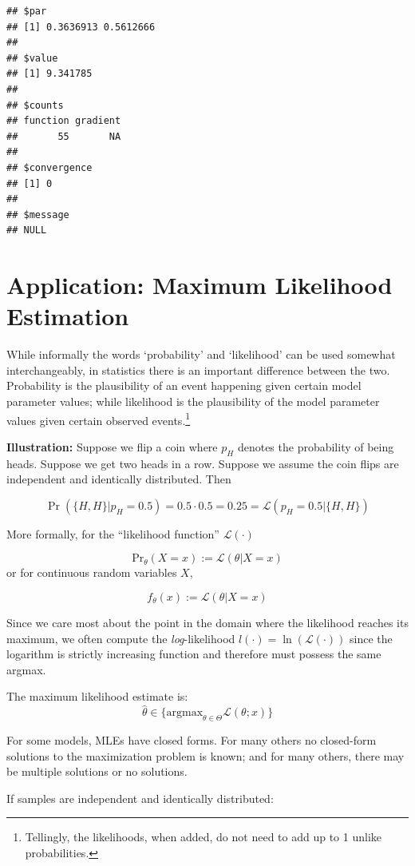 \documentclass[11pt,]{article}
\let\rmarkdownfootnote\footnote%
\def\footnote{\protect\rmarkdownfootnote}
\begin{document}
\begin{verbatim}
## $par
## [1] 0.3636913 0.5612666
## 
## $value
## [1] 9.341785
## 
## $counts
## function gradient 
##       55       NA 
## 
## $convergence
## [1] 0
## 
## $message
## NULL
\end{verbatim}

\section{Application: Maximum Likelihood
Estimation}\label{application-maximum-likelihood-estimation}

While informally the words `probability' and `likelihood' can be used
somewhat interchangeably, in statistics there is an important difference
between the two. Probability is the plausibility of an event happening
given certain model parameter values; while likelihood is the
plausibility of the model parameter values given certain observed
events.\footnote{Tellingly, the likelihoods, when added, do not need to
  add up to 1 unlike probabilities.}

\textbf{Illustration:} Suppose we flip a coin where \(p_H\) denotes the
probability of being heads. Suppose we get two heads in a row. Suppose
we assume the coin flips are independent and identically distributed.
Then

\[\Pr(\{H,H\}|p_H = 0.5) = 0.5\cdot0.5=0.25= \mathcal{L}(p_H=0.5|\{H,H\})\]

More formally, for the ``likelihood function'' \(\mathcal{L}(\cdot)\)

\[\text{Pr}_{\theta}(X = x) := \mathcal{L}(\theta|X = x)\] or for
continuous random variables \(X\),

\[f_{\theta}(x) := \mathcal{L}(\theta|X=x)\]

Since we care most about the point in the domain where the likelihood
reaches its maximum, we often compute the \emph{log}-likelihood
\(l(\cdot)=\ln(\mathcal{L}(\cdot))\) since the logarithm is strictly
increasing function and therefore must possess the same argmax.

The maximum likelihood estimate is:
\[\hat{\theta}\in\{\text{argmax}_{\theta\in \Theta} \mathcal{L}(\theta; x)\}\]

For some models, MLEs have closed forms. For many others no closed-form
solutions to the maximization problem is known; and for many others,
there may be multiple solutions or no solutions.

If samples are independent and identically distributed:
\end{document}
